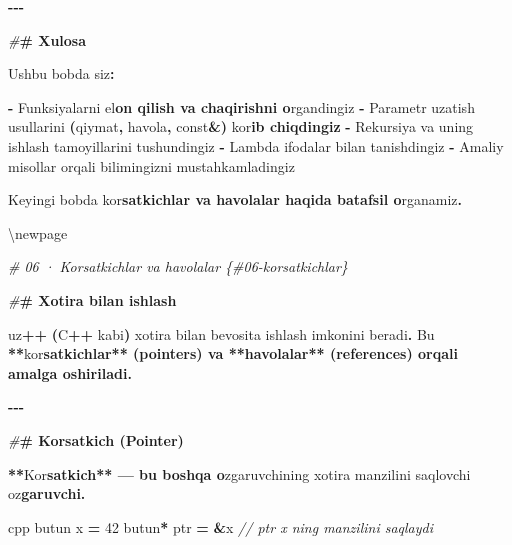 \documentclass[a4paper,11pt,twoside,openright]{book}
\newenvironment{Shaded}{\begin{snugshade}}{\end{snugshade}}
\newcommand{\CharTok}[1]{\textcolor[rgb]{0.31,0.60,0.02}{#1}}
\newcommand{\CommentTok}[1]{\textcolor[rgb]{0.56,0.35,0.01}{\textit{#1}}}
\newcommand{\DecValTok}[1]{\textcolor[rgb]{0.00,0.00,0.81}{#1}}
\newcommand{\ErrorTok}[1]{\textcolor[rgb]{0.64,0.00,0.00}{\textbf{#1}}}
\newcommand{\NormalTok}[1]{#1}
\newcommand{\OperatorTok}[1]{\textcolor[rgb]{0.81,0.36,0.00}{\textbf{#1}}}
\newcommand{\PreprocessorTok}[1]{\textcolor[rgb]{0.56,0.35,0.01}{\textit{#1}}}
\begin{document}
\begin{Shaded}
\begin{Highlighting}[]
\OperatorTok{{-}{-}{-}}

\PreprocessorTok{\#}\ErrorTok{\# Xulosa}

\NormalTok{Ushbu bobda siz}\OperatorTok{:}

\OperatorTok{{-}}\NormalTok{ Funksiyalarni e}\CharTok{\textquotesingle{}l}\ErrorTok{on qilish va chaqirishni o}\CharTok{\textquotesingle{}}\NormalTok{rgandingiz}
\OperatorTok{{-}}\NormalTok{ Parametr uzatish usullarini }\OperatorTok{(}\NormalTok{qiymat}\OperatorTok{,}\NormalTok{ havola}\OperatorTok{,} \ErrorTok{\textasciigrave{}}\NormalTok{const}\OperatorTok{\&}\ErrorTok{\textasciigrave{}}\OperatorTok{)}\NormalTok{ ko}\CharTok{\textquotesingle{}r}\ErrorTok{ib chiqdingiz}
\OperatorTok{{-}}\NormalTok{ Rekursiya va uning ishlash tamoyillarini tushundingiz}
\OperatorTok{{-}}\NormalTok{ Lambda ifodalar bilan tanishdingiz}
\OperatorTok{{-}}\NormalTok{ Amaliy misollar orqali bilimingizni mustahkamladingiz}

\NormalTok{Keyingi bobda ko}\CharTok{\textquotesingle{}r}\ErrorTok{satkichlar va havolalar haqida batafsil o}\CharTok{\textquotesingle{}}\NormalTok{rganamiz}\OperatorTok{.}


\NormalTok{\textbackslash{}newpage}

\PreprocessorTok{\# 06 · Ko\textquotesingle{}rsatkichlar va havolalar \{\#06{-}korsatkichlar\}}

\PreprocessorTok{\#}\ErrorTok{\# Xotira bilan ishlash}

\NormalTok{uz}\OperatorTok{++} \OperatorTok{(}\NormalTok{C}\OperatorTok{++}\NormalTok{ kabi}\OperatorTok{)}\NormalTok{ xotira bilan bevosita ishlash imkonini beradi}\OperatorTok{.}\NormalTok{ Bu }\OperatorTok{**}\NormalTok{ko}\CharTok{\textquotesingle{}r}\ErrorTok{satkichlar** (pointers) va **havolalar** (references) orqali amalga oshiriladi.}

\OperatorTok{{-}{-}{-}}

\PreprocessorTok{\#}\ErrorTok{\# Ko\textquotesingle{}rsatkich (Pointer)}

\OperatorTok{**}\NormalTok{Ko}\CharTok{\textquotesingle{}r}\ErrorTok{satkich** — bu boshqa o}\CharTok{\textquotesingle{}}\NormalTok{zgaruvchining xotira manzilini saqlovchi o}\CharTok{\textquotesingle{}z}\ErrorTok{garuvchi.}

\ErrorTok{\textasciigrave{}\textasciigrave{}\textasciigrave{}}\NormalTok{cpp}
\NormalTok{butun x }\OperatorTok{=} \DecValTok{42}
\NormalTok{butun}\OperatorTok{*}\NormalTok{ ptr }\OperatorTok{=} \OperatorTok{\&}\NormalTok{x      }\CommentTok{// ptr x ning manzilini saqlaydi}


\end{Highlighting}
\end{Shaded}
\end{document}
